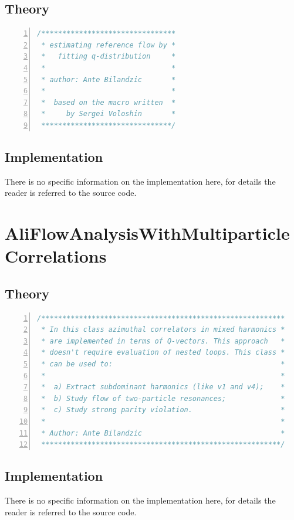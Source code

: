 \documentclass[a4paper]{book}
\numberwithin{equation}{subsection}
\begin{document}
\subsection{Theory}
\begin{lstlisting}[language=C, numbers=left]
/******************************** 
 * estimating reference flow by *
 *   fitting q-distribution     * 
 *                              *
 * author: Ante Bilandzic       * 
 *                              *  
 *  based on the macro written  *
 *     by Sergei Voloshin       *
 *******************************/  \end{lstlisting}
\subsection{Implementation}
There is no specific information on the implementation here, for details the reader is referred to the source code.


\section{AliFlowAnalysisWithMultiparticleCorrelations}
\subsection{Theory}
\begin{lstlisting}[language=C, numbers=left]
/********************************************************** 
 * In this class azimuthal correlators in mixed harmonics *
 * are implemented in terms of Q-vectors. This approach   *
 * doesn't require evaluation of nested loops. This class *
 * can be used to:                                        *
 *                                                        *  
 *  a) Extract subdominant harmonics (like v1 and v4);    *
 *  b) Study flow of two-particle resonances;             *
 *  c) Study strong parity violation.                     * 
 *                                                        * 
 * Author: Ante Bilandzic                                 *
 *********************************************************/ \end{lstlisting}
\subsection{Implementation}
There is no specific information on the implementation here, for details the reader is referred to the source code.
\end{document}
